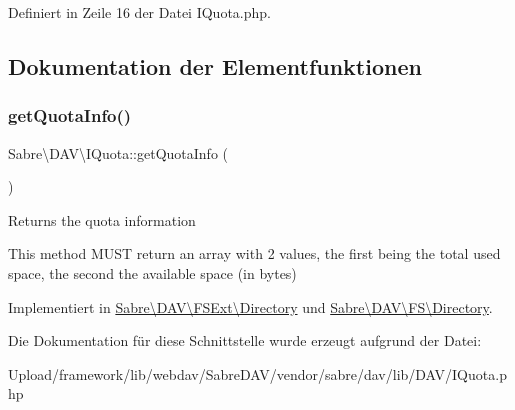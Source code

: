 Definiert in Zeile 16 der Datei I\+Quota.\+php.



\subsection{Dokumentation der Elementfunktionen}
\mbox{\label{interface_sabre_1_1_d_a_v_1_1_i_quota_a38730776dffcebd1c486acaf1bf470e4}} 
\subsubsection{\texorpdfstring{get\+Quota\+Info()}{getQuotaInfo()}}
{\footnotesize\ttfamily Sabre\textbackslash{}\+D\+A\+V\textbackslash{}\+I\+Quota\+::get\+Quota\+Info (\begin{DoxyParamCaption}{ }\end{DoxyParamCaption})}

Returns the quota information

This method M\+U\+ST return an array with 2 values, the first being the total used space, the second the available space (in bytes) 

Implementiert in \mbox{\hyperlink{class_sabre_1_1_d_a_v_1_1_f_s_ext_1_1_directory_ade982b162db5a0310179c05a2d47a507}{Sabre\textbackslash{}\+D\+A\+V\textbackslash{}\+F\+S\+Ext\textbackslash{}\+Directory}} und \mbox{\hyperlink{class_sabre_1_1_d_a_v_1_1_f_s_1_1_directory_aea57550df5c833e8c056451f364ea2de}{Sabre\textbackslash{}\+D\+A\+V\textbackslash{}\+F\+S\textbackslash{}\+Directory}}.



Die Dokumentation für diese Schnittstelle wurde erzeugt aufgrund der Datei\+:\begin{DoxyCompactItemize}
\item 
Upload/framework/lib/webdav/\+Sabre\+D\+A\+V/vendor/sabre/dav/lib/\+D\+A\+V/I\+Quota.\+php\end{DoxyCompactItemize}
